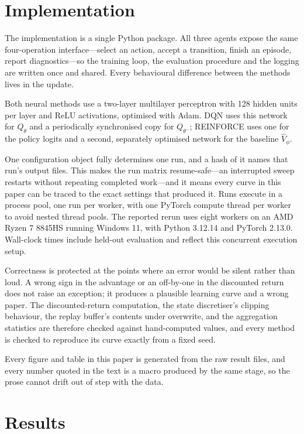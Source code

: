 \documentclass[conference]{IEEEtran}
\begin{document}
\section{Implementation}

The implementation is a single Python package. All three agents expose the same
four-operation interface---select an action, accept a transition, finish an
episode, report diagnostics---so the training loop, the evaluation procedure and
the logging are written once and shared. Every behavioural difference between the
methods lives in the update.

Both neural methods use a two-layer multilayer perceptron with 128 hidden units
per layer and ReLU activations, optimised with Adam. DQN uses this network for
$Q_\theta$ and a periodically synchronised copy for $Q_{\theta^-}$; REINFORCE
uses one for the policy logits and a second, separately optimised network for the
baseline $\hat{V}_\phi$.

One configuration object fully determines one run, and a hash of it names that
run's output files. This makes the run matrix resume-safe---an interrupted sweep
restarts without repeating completed work---and it means every curve in this
paper can be traced to the exact settings that produced it. Runs execute in a
process pool, one run per worker, with one PyTorch compute thread per worker to
avoid nested thread pools. The reported rerun uses eight workers on an AMD Ryzen
7 8845HS running Windows 11, with Python 3.12.14 and PyTorch 2.13.0. Wall-clock
times include held-out evaluation and reflect this concurrent execution setup.

Correctness is protected at the points where an error would be silent rather than
loud. A wrong sign in the advantage or an off-by-one in the discounted return
does not raise an exception; it produces a plausible learning curve and a wrong
paper. The discounted-return computation, the state discretiser's clipping
behaviour, the replay buffer's contents under overwrite, and the aggregation
statistics are therefore checked against hand-computed values, and every method
is checked to reproduce its curve exactly from a fixed seed.

Every figure and table in this paper is generated from the raw result files, and
every number quoted in the text is a macro produced by the same stage, so the
prose cannot drift out of step with the data.

\section{Results}
\label{sec:results}
\end{document}
